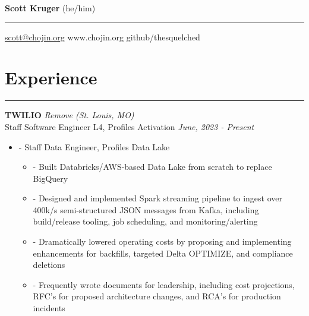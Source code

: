 \documentclass[a4paper,11pt]{article}
\newenvironment{pitemize}{
\begin{itemize}
\setlength{\itemsep}{.01in}
\setlength{\parskip}{.01in}
}
{\end{itemize}}
\begin{document}
\Huge{\textbf{Scott Kruger}} \hfill \normalsize{(he/him)}
\hrule
\vspace{0.05in}
\normalsize{
    \href{mailto:scott@chojin.org}{scott@chojin.org} 
    \hfill www.chojin.org \hfill github/thesquelched
}

\section*{\huge{Experience}}
\hrule
\vspace{0.1in}

\textbf{TWILIO} \hfill \textit{Remove (St. Louis, MO)} \\
Staff Software Engineer L4, Profiles Activation \hfill \textit{June, 2023 - Present}
\begin{pitemize}
    \item[-]Staff Data Engineer, Profiles Data Lake
    \begin{pitemize}
        \item[-]Built Databricks/AWS-based Data Lake from scratch to replace BigQuery
        \item[-]Designed and implemented Spark streaming pipeline to ingest over 400k/s semi-structured JSON messages from Kafka, including build/release tooling, job scheduling, and monitoring/alerting
        \item[-]Dramatically lowered operating costs by proposing and implementing enhancements for backfills, targeted Delta OPTIMIZE, and compliance deletions
        \item[-]Frequently wrote documents for leadership, including cost projections, RFC's for proposed architecture changes, and RCA's for production incidents
    \end{pitemize}
\end{pitemize}
\end{document}
